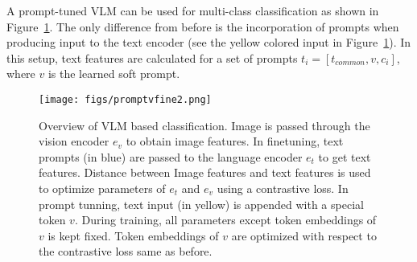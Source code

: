\documentclass[10pt,twocolumn,letterpaper]{article}
\begin{document}
 A prompt-tuned VLM can be used for multi-class classification as shown in Figure~\ref{fig:classification}. The only difference from before is the incorporation of prompts when producing input to the text encoder (see the yellow colored input in Figure~\ref{fig:classification}). In this setup,   text features are calculated for a set of prompts $t_i = [ t_{common}, v, c_i ]$, where $v$ is the learned soft prompt.


\begin{figure}[h] 
\centering
\texttt{[image: figs/promptvfine2.png]} 
\caption{Overview of VLM based classification. Image is passed through the vision encoder $e_v$ to obtain image features. In finetuning, text prompts (in blue) are passed to the language encoder $e_t$ to get text features. Distance between Image features and text features is used to optimize parameters of $e_t$ and $e_v$ using a contrastive loss. In prompt tunning, text input (in yellow) is appended with a special token $v$. During training, all parameters except token embeddings of $v$ is kept fixed. Token embeddings of $v$ are optimized with respect to the contrastive loss same as before. }
\label{fig:classification}
\end{figure}






    
\end{document}
